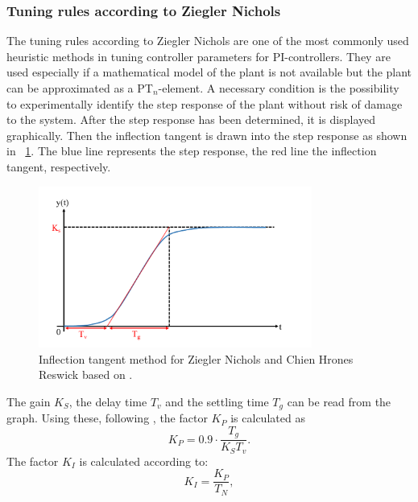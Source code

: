 \subsubsection{Tuning rules according to Ziegler Nichols} \label{chap:ZN}
The tuning rules according to Ziegler Nichols are one of the most commonly used heuristic methods in tuning controller parameters for PI-controllers. They are used especially if a mathematical model of the plant is not available but the plant can be approximated as a PT$_{n}$-element. \cite{Reg_17}
A necessary condition is the possibility to experimentally identify the step response of the plant without risk of damage to the system. After the step response has been determined, it is displayed graphically. Then the inflection tangent is drawn into the step response as shown in \figurename~\ref{fig:param_zn}. The blue line represents the step response, the red line the inflection tangent, respectively.
\begin{figure}
   \centering
   \includegraphics[width=0.8\textwidth]{images/chapt_3/param_zn.pdf}
   \caption[Inflection tangent method for Ziegler Nichols and Chien Hrones Reswick]{Inflection tangent method for Ziegler Nichols and Chien Hrones Reswick based on \cite{Reg_17}.}
   \label{fig:param_zn}
 \end{figure}
The gain $K_{S}$, the delay time $T_{v}$ and the settling time $T_{g}$ can be read from the graph.
Using these, following \cite{Reg_17}, the factor $K_{P}$ is calculated as
\begin{equation}
  K_{P} = 0.9\cdot\frac{T_{g}}{K_{S}T_{v}}.
  \label{eq:kp_zn}
\end{equation}
The factor $K_{I}$ is calculated according to:
\begin{equation}
    K_{I}  = \frac{K_{P}}{T_{N}},
 \label{eq:K_I}
\end{equation}
